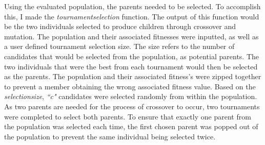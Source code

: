 \documentclass[11pt]{article}
\begin{document}
Using the evaluated population, the parents needed to be selected. To accomplish this, I made the \textit{tournament\textunderscore selection} function. The output of this function would be the two individuals selected to produce children through crossover and mutation. 
The population and their associated fitnesses were inputted, as well as a user defined tournament selection size. The size refers to the number of candidates that would be selected from the population, as potential parents. The two individuals that were the best from each tournament would then be selected as the parents. The population and their associated fitness's were zipped together to prevent a member obtaining the wrong associated fitness value. Based on the \textit{selection\textunderscore size}, \textit{``c"} candidates were selected randomly from within the population. As two parents are needed for the process of crossover to occur, two tournaments were completed to select both parents. To ensure that exactly one parent from the population was selected each time, the first chosen parent was popped out of the population to prevent the same individual being selected twice. 
\end{document}
